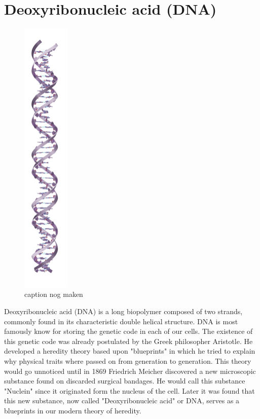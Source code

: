 \section{Deoxyribonucleic acid (DNA)}

\begin{figure}
  \begin{center}
    \includegraphics[width=0.20\textwidth]{Figures/DNA1.png}
  \end{center}
  \caption{caption nog maken}
\end{figure}

Deoxyribonucleic acid (DNA) is a long biopolymer composed of two strands, commonly found
in its characteristic double helical structure. DNA is most famously know for storing the
genetic code in each of our cells. The existence of this genetic code was already
postulated by the Greek philosopher Aristotle. He developed a heredity theory based
upon "blueprints" in which he tried to explain why physical traits where passed on from
generation to generation. This theory would go unnoticed until in 1869
Friedrich Meicher discovered a new microscopic substance found on discarded
surgical bandages. He would call this substance "Nuclein" since it originated
form the nucleus of the cell. Later it was found that this new substance, now called
"Deoxyribonucleic acid" or DNA, serves as a blueprints in our modern theory of
heredity.

